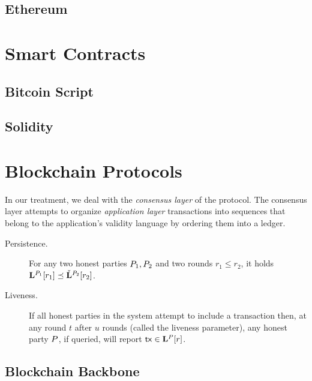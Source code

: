 \subsection{Ethereum}

\section{Smart Contracts}
\subsection{Bitcoin Script}
\subsection{Solidity}


\section{Blockchain Protocols}

In our treatment, we deal with the \emph{consensus layer}
of the protocol. The consensus layer attempts to organize
\emph{application layer} transactions into sequences that belong to the
application's validity language by ordering them into a ledger.

\begin{definition}[Ledger]
\end{definition}

\begin{description}
  \item[Persistence.]
    For any two honest parties $P_1,P_2$ and two rounds $r_1\leq r_2$,
    it holds  $\mathbf{L}^{P_1}[r_1] \preceq
    \check{\mathbf{L}}^{P_2}[r_2]$.

  \item[Liveness.]
    If all honest parties in the system attempt to include a  transaction
    then, at any round $t$ after $u$ rounds (called the
    liveness parameter), any honest party $P$, if queried,
    will report $\mathsf{tx} \in \mathbf{L}^{P}[r]$.
\end{description}


\subsection{Blockchain Backbone}


